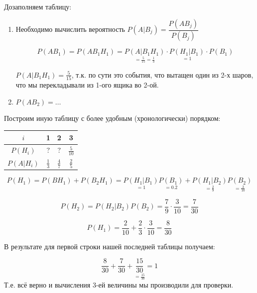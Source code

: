 Дозаполняем таблицу:

\begin{enumerate}
	\item Необходимо вычислить вероятность $P(A|B_j) = \dfrac{P(AB_j)}{P(B_j)}$
	
	\[ P(AB_1) = P(AB_1H_1) = \underset{=\frac{5}{15}=\frac{1}{3}}{P(A|B_1H_1)} \cdot \underset{=1}{P(H_1|B_1)} \cdot P(B_1) \]
	
	$P(A|B_1H_1) = \frac{5}{15}$, т.к. по сути это события, что вытащен один из 2-х шаров, что мы перекладывали из 1-ого ящика во 2-ой.
	
	\item $P(AB_2) = \dots$
\end{enumerate}

Построим иную таблицу с более удобным (хронологически) порядком:

\begin{table}[H]
	\centering
	\begin{tabular}{|c|c|c|c|}
		\hline
		$i$        & 1             & 2             & 3              \\ \hline
		$P(H_i)$   & $?$           & $?$           & $\frac{5}{10}$ \\ \hline
		$P(A|H_i)$ & $\frac{1}{3}$ & $\frac{4}{7}$ & $\frac{2}{5}$  \\ \hline
	\end{tabular}
\end{table}

\[ P(H_1) = P(BH_1) + P(B_2H_1) = \underset{=1}{P(H_1|B_1)} \underset{=0.2}{P(B_1)} + \underset{=\frac{2}{9}}{P(H_1|B_2)} \underset{=\frac{3}{10}}{P(B_2)} \]

\[ P(H_2) = P(H_2|B_2) P(B_2) = \frac{7}{9} \cdot \frac{3}{10} = \frac{7}{30} \]

\[ P(H_1) = \frac{2}{10} + \frac{2}{3} \cdot \frac{3}{10} = \frac{8}{30} \]

В результате для первой строки нашей последней таблицы получаем:

\[ \frac{8}{30} + \frac{7}{30} + \underset{=\frac{15}{30}}{\frac{15}{30}} = 1 \]
Т.е. всё верно и вычисления 3-ей величины мы производили для проверки. 

 